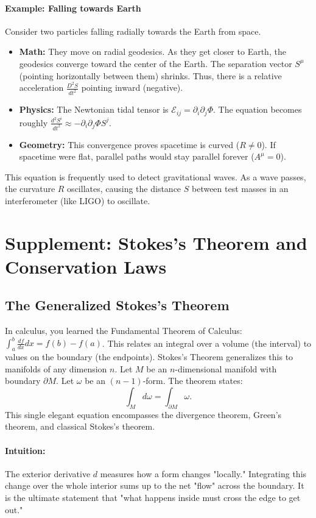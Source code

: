 \documentclass[11pt, a4paper]{report}
\begin{document}
\paragraph{Example: Falling towards Earth}
Consider two particles falling radially towards the Earth from space.
\begin{itemize}
    \item \textbf{Math:} They move on radial geodesics. As they get closer to Earth, the geodesics converge toward the center of the Earth. The separation vector \(S^\mu\) (pointing horizontally between them) shrinks. Thus, there is a relative acceleration \(\frac{D^2 S}{dt^2}\) pointing inward (negative).
    \item \textbf{Physics:} The Newtonian tidal tensor is \(\mathcal{E}_{ij} = \partial_i \partial_j \Phi\). The equation becomes roughly \(\frac{d^2 S^i}{dt^2} \approx - \partial_i \partial_j \Phi S^j\).
    \item \textbf{Geometry:} This convergence proves spacetime is curved (\(R \neq 0\)). If spacetime were flat, parallel paths would stay parallel forever (\(A^\mu = 0\)).
\end{itemize}
This equation is frequently used to detect gravitational waves. As a wave passes, the curvature \(R\) oscillates, causing the distance \(S\) between test masses in an interferometer (like LIGO) to oscillate.
\section{Supplement: Stokes's Theorem and Conservation Laws}

\subsection*{The Generalized Stokes's Theorem}
In calculus, you learned the Fundamental Theorem of Calculus: $\int_a^b \frac{df}{dx} dx = f(b) - f(a)$. This relates an integral over a volume (the interval) to values on the boundary (the endpoints).
Stokes's Theorem generalizes this to manifolds of any dimension $n$. Let $M$ be an $n$-dimensional manifold with boundary $\partial M$. Let $\omega$ be an $(n-1)$-form. The theorem states:
\begin{equation}
\int_M d\omega = \int_{\partial M} \omega.
\end{equation}
This single elegant equation encompasses the divergence theorem, Green's theorem, and classical Stokes's theorem.

\paragraph{Intuition:} The exterior derivative $d$ measures how a form changes "locally." Integrating this change over the whole interior sums up to the net "flow" across the boundary. It is the ultimate statement that "what happens inside must cross the edge to get out."
\end{document}
